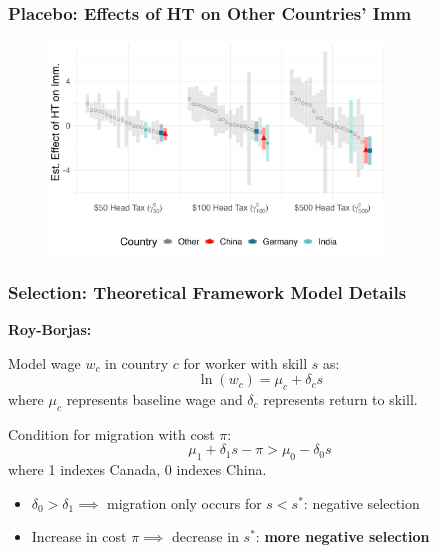 \documentclass[xcolor=dvipsnames, compress, 12pt, aspectratio=169, handout]{beamer}
\begin{document}
\begin{frame}
    \label{flow_placebo2}
    \frametitle{Placebo: Effects of HT on Other Countries' Imm \hyperlink{reg_flow}{}}
    \centering
    \begin{figure}
        \includegraphics[width = 0.8\textwidth]{../../figs/slides/immflow_countries.png}
    \end{figure}
\end{frame}

\begin{frame}
    \label{theory1}
    \frametitle{Selection: Theoretical Framework Model Details \hyperlink{theory_main}{}}
    \textbf{Roy-Borjas:} \vspace{1mm}

    Model wage $w_c$ in country $c$ for worker with skill $s$ as: 
    \begin{equation}
        \ln(w_c) = \mu_c + \delta_c s 
    \end{equation}
    where $\mu_c$ represents baseline wage and $\delta_c$ represents return to skill.
    \vspace{1mm}

    Condition for migration with cost $\pi$:
    \begin{equation}
        \mu_1 + \delta_1 s - \pi > \mu_0 - \delta_0s
    \end{equation}
    where 1 indexes Canada, 0 indexes China.
    \vspace{1mm}
    \begin{itemize}
        \item $\delta_0 > \delta_1 \implies$ migration only occurs for $s < s^*$: negative selection
        \vspace{1mm}
        \item Increase in cost $\pi \implies $ decrease in $s^*$: \textbf{more negative selection}
    \end{itemize}
\end{frame}
\end{document}
